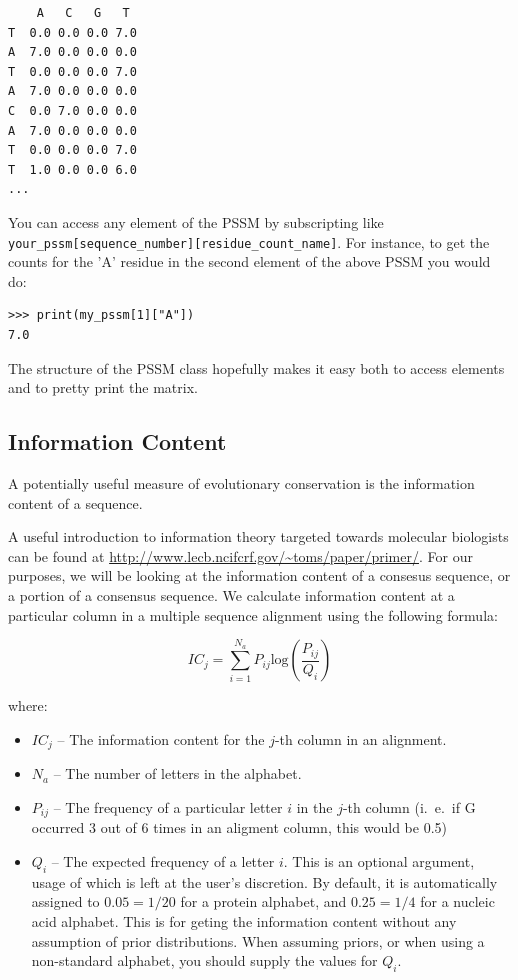 \documentclass{report}
\begin{document}
\begin{verbatim}
    A   C   G   T
T  0.0 0.0 0.0 7.0
A  7.0 0.0 0.0 0.0
T  0.0 0.0 0.0 7.0
A  7.0 0.0 0.0 0.0
C  0.0 7.0 0.0 0.0
A  7.0 0.0 0.0 0.0
T  0.0 0.0 0.0 7.0
T  1.0 0.0 0.0 6.0
...
\end{verbatim}

You can access any element of the PSSM by subscripting like \verb|your_pssm[sequence_number][residue_count_name]|. For instance, to get the counts for the 'A' residue in the second element of the above PSSM you would do:

\begin{verbatim}
>>> print(my_pssm[1]["A"])
7.0
\end{verbatim}

The structure of the PSSM class hopefully makes it easy both to access elements and to pretty print the matrix.

\subsection{Information Content}
\label{sec:getting_info_content}

A potentially useful measure of evolutionary conservation is the information content of a sequence.

A useful introduction to information theory targeted towards molecular biologists can be found at \url{http://www.lecb.ncifcrf.gov/~toms/paper/primer/}. For our purposes, we will be looking at the information content of a consesus sequence, or a portion of a consensus sequence. We calculate information content at a particular column in a multiple sequence alignment using the following formula:

\begin{displaymath}
IC_{j} = \sum_{i=1}^{N_{a}} P_{ij} \mathrm{log}\left(\frac{P_{ij}}{Q_{i}}\right)
\end{displaymath}

\noindent where:

\begin{itemize}
  \item $IC_{j}$ -- The information content for the $j$-th column in an alignment.
  \item $N_{a}$ -- The number of letters in the alphabet.
  \item $P_{ij}$ -- The frequency of a particular letter $i$ in the $j$-th column (i.~e.~if G occurred 3 out of 6 times in an aligment column, this would be 0.5)
  \item $Q_{i}$ --  The expected frequency of a letter $i$. This is an
  optional argument, usage of which is left at the user's
  discretion. By default, it is automatically assigned to $0.05 = 1/20$ for a
  protein alphabet, and $0.25 = 1/4$ for a nucleic acid alphabet. This is for
  geting the information content without any assumption of prior
  distributions. When assuming priors, or when using a non-standard
  alphabet, you should supply the values for $Q_{i}$.
\end{itemize}
\end{document}
